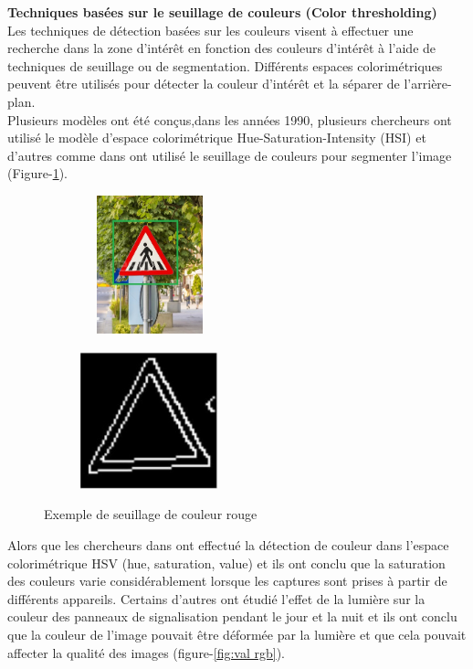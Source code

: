 {\textbf{Techniques basées sur le seuillage de couleurs (Color thresholding) }}\\

Les techniques de détection basées sur les couleurs visent à effectuer une recherche dans la zone d'intérêt en fonction des couleurs d'intérêt à l'aide de techniques de seuillage ou de segmentation. Différents espaces colorimétriques peuvent être utilisés pour détecter la couleur d'intérêt et la séparer de l'arrière-plan.\\ Plusieurs modèles ont été conçus,dans les années 1990, plusieurs chercheurs ont utilisé le modèle d'espace colorimétrique Hue-Saturation-Intensity (HSI) \cite{12} et d'autres comme dans \cite{13} ont utilisé le seuillage de couleurs pour segmenter l'image (Figure-\ref{fig:seuillage de couleur}).

\begin{figure}[h]
      \centering
      \begin{subfigure}
      \centering
      \includegraphics[width=4cm,height=4cm]{images/m06y4.jpg}
      \end{subfigure}
      \begin{subfigure}
      \centering
      \includegraphics[width=4cm,height=4cm]{images/111.png}
      \end{subfigure}
    \caption{Exemple de seuillage de couleur rouge}
    \label{fig:seuillage de couleur}
\end{figure}

Alors que les chercheurs dans \cite{14} ont effectué la détection de couleur dans l'espace colorimétrique HSV (hue, saturation, value) et ils ont conclu que la saturation des couleurs varie considérablement lorsque les captures sont prises à partir de différents appareils. Certains d'autres \cite{15} ont étudié l'effet de la lumière sur la couleur des panneaux de signalisation pendant le jour et la nuit et ils ont conclu que la couleur de l'image pouvait être déformée par la lumière et que cela pouvait affecter la qualité des images (figure-\ref{fig:val rgb}).

